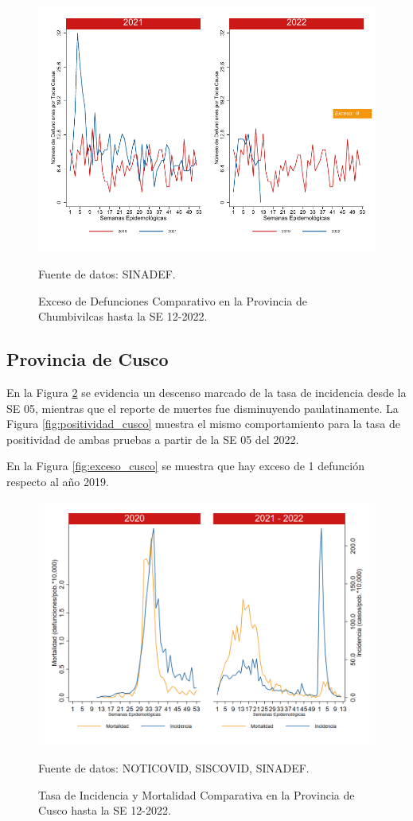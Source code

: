 \documentclass[12pt,a4paper,openany]{book}
\begin{document}
		\begin{figure}[h]
			\caption{Exceso de Defunciones Comparativo en la Provincia de Chumbivilcas hasta la SE 12-2022.}\label{fig:exceso_chumbivilcas}
			\begin{center}
				\includegraphics[width=0.7\linewidth]{../figuras/exceso_6.pdf}
			\end{center}
			{\footnotesize {Fuente de datos: SINADEF.}}
		\end{figure}
		
		\clearpage
		
		\subsection*{Provincia de Cusco}
		\noindent En la Figura \ref{fig:inc_mort_cusco} se evidencia un descenso marcado de la tasa de incidencia desde la SE 05, mientras que el reporte de muertes fue disminuyendo paulatinamente.   
		\noindent La  Figura \ref{fig:positividad_cusco} muestra el mismo comportamiento para la tasa de positividad de ambas pruebas a partir de la SE 05 del 2022.
	
	En la Figura \ref{fig:exceso_cusco} se muestra que hay exceso de 1 defunción respecto al año 2019.
		
		\begin{figure}[h]
			\caption{Tasa de Incidencia y Mortalidad Comparativa en la Provincia de Cusco hasta la SE 12-2022.}\label{fig:inc_mort_cusco}
			\begin{center}
				\includegraphics[width=0.85\linewidth]{../figuras/incidencia_mortalidad_20_21_7.png}
			\end{center}
			{\footnotesize {Fuente de datos: NOTICOVID, SISCOVID, SINADEF.}}
		\end{figure}
		
\end{document}
